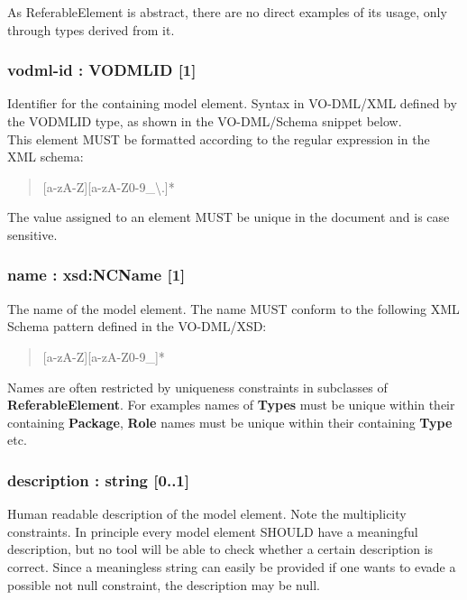 \documentclass[10pt,a4paper]{ivoa}
\begin{document}
As ReferableElement is abstract, there are no direct examples of its
usage, only through types derived from it.

\hypertarget{vodml-id-vodmlid-1}{%
\subsubsection{vodml-id : VODMLID {[}1{]}}\label{vodml-id-vodmlid-1}}

Identifier for the containing model element. Syntax in VO-DML/XML
defined by the VODMLID type, as shown in the VO-DML/Schema snippet
below.\\
This element MUST be formatted according to the regular expression in
the XML schema:

\begin{quote}
{[}a-zA-Z{]}{[}a-zA-Z0-9\_\textbackslash.{]}*
\end{quote}

The value assigned to an element MUST be unique in the document and is
case sensitive.

\hypertarget{name-xsdncname-1}{%
\subsubsection{name : xsd:NCName {[}1{]}}\label{name-xsdncname-1}}

The name of the model element. The name MUST conform to the following
XML Schema pattern defined in the VO-DML/XSD:

\begin{quote}
{[}a-zA-Z{]}{[}a-zA-Z0-9\_{]}*
\end{quote}

Names are often restricted by uniqueness constraints in subclasses of
\textbf{ReferableElement}. For examples names of \textbf{Types} must be
unique within their containing \textbf{Package}, \textbf{Role} names
must be unique within their containing \textbf{Type} etc.

\hypertarget{description-string-0..1}{%
\subsubsection{description : string
{[}0..1{]}}\label{description-string-0..1}}

Human readable description of the model element. Note the multiplicity
constraints. In principle every model element SHOULD have a meaningful
description, but no tool will be able to check whether a certain
description is correct. Since a meaningless string can easily be
provided if one wants to evade a possible not null constraint, the
description may be null.
\end{document}
